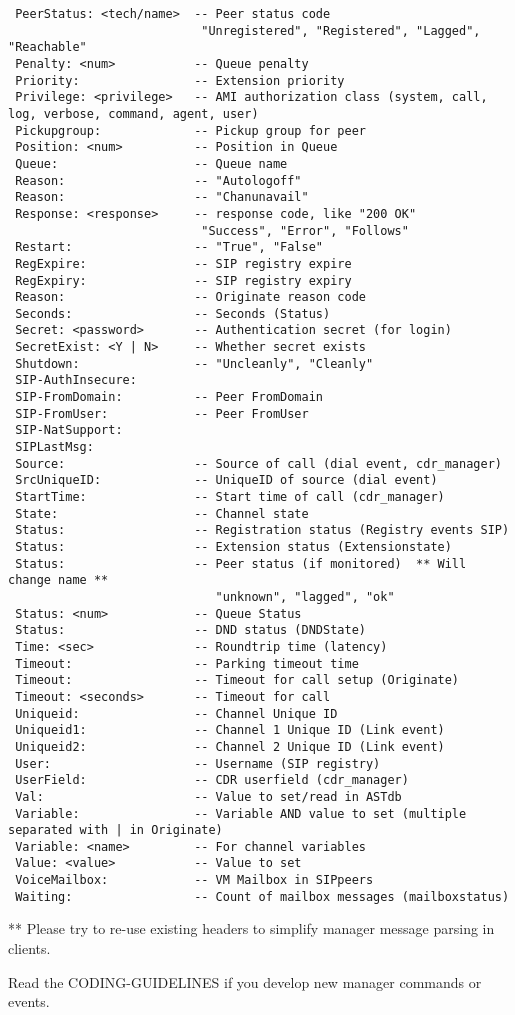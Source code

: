 \begin{verbatim}
 PeerStatus: <tech/name>  -- Peer status code
                           "Unregistered", "Registered", "Lagged", "Reachable"
 Penalty: <num>           -- Queue penalty
 Priority:                -- Extension priority
 Privilege: <privilege>   -- AMI authorization class (system, call, log, verbose, command, agent, user)
 Pickupgroup:             -- Pickup group for peer
 Position: <num>          -- Position in Queue
 Queue:                   -- Queue name
 Reason:                  -- "Autologoff"
 Reason:                  -- "Chanunavail"
 Response: <response>     -- response code, like "200 OK"
                           "Success", "Error", "Follows"
 Restart:                 -- "True", "False"
 RegExpire:               -- SIP registry expire
 RegExpiry:               -- SIP registry expiry
 Reason:                  -- Originate reason code
 Seconds:                 -- Seconds (Status)
 Secret: <password>       -- Authentication secret (for login)
 SecretExist: <Y | N>     -- Whether secret exists
 Shutdown:                -- "Uncleanly", "Cleanly"
 SIP-AuthInsecure:
 SIP-FromDomain:          -- Peer FromDomain
 SIP-FromUser:            -- Peer FromUser
 SIP-NatSupport:
 SIPLastMsg:
 Source:                  -- Source of call (dial event, cdr_manager)
 SrcUniqueID:             -- UniqueID of source (dial event)
 StartTime:               -- Start time of call (cdr_manager)
 State:                   -- Channel state
 Status:                  -- Registration status (Registry events SIP)
 Status:                  -- Extension status (Extensionstate)
 Status:                  -- Peer status (if monitored)  ** Will change name **
                             "unknown", "lagged", "ok"
 Status: <num>            -- Queue Status
 Status:                  -- DND status (DNDState)
 Time: <sec>              -- Roundtrip time (latency)
 Timeout:                 -- Parking timeout time
 Timeout:                 -- Timeout for call setup (Originate)
 Timeout: <seconds>       -- Timeout for call
 Uniqueid:                -- Channel Unique ID
 Uniqueid1:               -- Channel 1 Unique ID (Link event)
 Uniqueid2:               -- Channel 2 Unique ID (Link event)
 User:                    -- Username (SIP registry)
 UserField:               -- CDR userfield (cdr_manager)
 Val:                     -- Value to set/read in ASTdb
 Variable:                -- Variable AND value to set (multiple separated with | in Originate)
 Variable: <name>         -- For channel variables
 Value: <value>           -- Value to set
 VoiceMailbox:            -- VM Mailbox in SIPpeers
 Waiting:                 -- Count of mailbox messages (mailboxstatus)
\end{verbatim}

 ** Please try to re-use existing headers to simplify manager message parsing in clients.

Read the CODING-GUIDELINES if you develop new manager commands or events.
